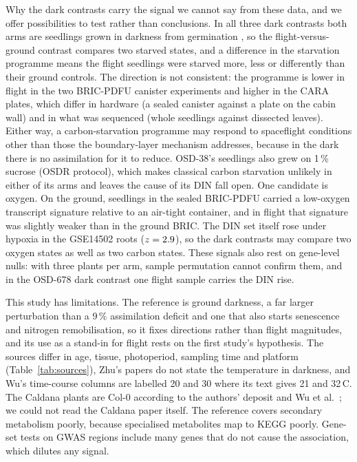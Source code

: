 \documentclass{npjlayout}
\begin{document}
Why the dark contrasts carry the signal we cannot say from these data, and we offer possibilities
to test rather than conclusions. In all
three dark contrasts both arms are seedlings grown in darkness from germination
\citep{osd38,osd321,osd678}, so the flight-versus-ground contrast compares two starved states, and
a difference in the starvation programme means the flight seedlings were starved more, less or
differently than their ground controls. The direction is not consistent: the programme is lower in
flight in the two BRIC-PDFU canister experiments and higher in the CARA plates, which differ in
hardware (a sealed canister against a plate on the cabin wall) and in what was sequenced (whole
seedlings against dissected leaves). Either way, a carbon-starvation programme may respond to
spaceflight conditions other than those the boundary-layer mechanism addresses, because in the dark
there is no assimilation for it to reduce. OSD-38's seedlings also grew on 1\,\% sucrose (OSDR protocol),
which makes classical carbon starvation unlikely in either of its arms and leaves the cause of its
DIN fall open. One candidate is oxygen. On the ground, seedlings in the sealed BRIC-PDFU carried a
low-oxygen transcript signature relative to an air-tight container, and in flight that signature
was slightly weaker than in the ground BRIC. The DIN set itself rose under hypoxia in the
GSE14502 roots ($z = 2.9$), so the dark contrasts may compare two oxygen states as well as two
carbon states. These signals also rest
on gene-level nulls: with three plants per arm, sample permutation cannot confirm them, and in the
OSD-678 dark contrast one flight sample carries the DIN rise.

This study has limitations. The reference is ground darkness, a far larger perturbation than a 9\,\% assimilation deficit and
one that also starts senescence and nitrogen remobilisation, so it fixes directions rather than
flight magnitudes, and its use as a stand-in for flight rests on the first study's hypothesis. The
sources differ in age, tissue, photoperiod, sampling time and platform (Table~\ref{tab:sources}),
Zhu's papers do not state the temperature in darkness, and Wu's time-course columns are labelled 20
and 30 where its text gives 21 and 32\,\textdegree C. The Caldana plants are Col-0 according to the
authors' deposit \citep{emtab375} and Wu et al.\ \citep{wu2018}; we could not read the Caldana paper
itself. The reference covers secondary metabolism poorly, because specialised metabolites map to
KEGG poorly. Gene-set tests on GWAS regions include many genes that do not cause the association,
which dilutes any signal.
\end{document}
